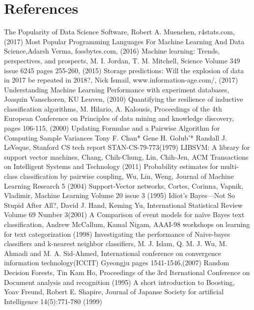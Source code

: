 \documentclass[a4paper,10pt]{article}
\begin{document}
\section{References}
\begingroup
\begin{thebibliography}{9}
 The Popularity of Data Science Software, Robert A. Muenchen, r4stats.com, (2017)
 Most Popular Programming Languages For Machine Learning And Data Science,Adarsh Verma, fossbytes.com, (2016)
Machine learning: Trends, perspectives, and prospects, M. I. Jordan, T. M. Mitchell, Science Volume 349 issue 6245 pages 255-260, (2015)
 Storage predictions: Will the explosion of data in 2017 be repeated in 2018?, Nick Ismail, www.information-age.com/, (2017)
 Understanding Machine Learning Performance with experiment databases, Joaquin Vanschoren, KU Leuven, (2010)
 Quantifying the resilience of inductive classification algorithms, M. Hilario, A. Kalousis, 
Proceedings of the 4th European Conference on Principles of data mining and knowledge discovery, pages 106-115, (2000)
Updating Formulae and a Pairwise Algorithm for Computing Sample Variances Tony F. Chan* Gene H. Golub’* Randall J. LeVeque, Stanford CS tech report STAN-CS-79-773(1979)
LIBSVM: A library for support vector machines, Chang, Chih-Chung, Lin, Chih-Jen, ACM Transactions on Intelligent Systems and Technology (2011)
 Probability estimates for multi-class classification by pairwise coupling, Wu, Lin, Weng, Journal of Machine Learning Research 5 (2004)
 Support-Vector networks, Cortes, Corinna, Vapnik, Vladimir, Machine Learning Volume 20 issue 3 (1995)
 Idiot’s Bayes—Not So Stupid After All?, David J. Hand, Keming Yu, International Statistical Review Volume 69 Number 3(2001)
 A Comparison of event models for naïve Bayes text classification, Andrew McCallum, Kamal Nigam, AAAI-98 workshops on learning for text categorization (1998)
 Investigating the performance of Naive-bayes classifiers and k-nearest neighbor classifiers, M. J. Islam, Q. M. J. Wu, M. Ahmadi and M. A. Sid-Ahmed, International conference on convergence information technology(ICCIT) Gyeongju pages 1541-1546,(2007)
 Random Decision Forests, Tin Kam Ho, Proceedings of the 3rd Iternational Conference on Document analysis and recognition (1995)
 A short introduction to Boosting, Yoav Freund, Robert E. Shapire, Journal of Japanse Society for artificial Intelligence 14(5):771-780 (1999)

\end{thebibliography}
\end{document}
